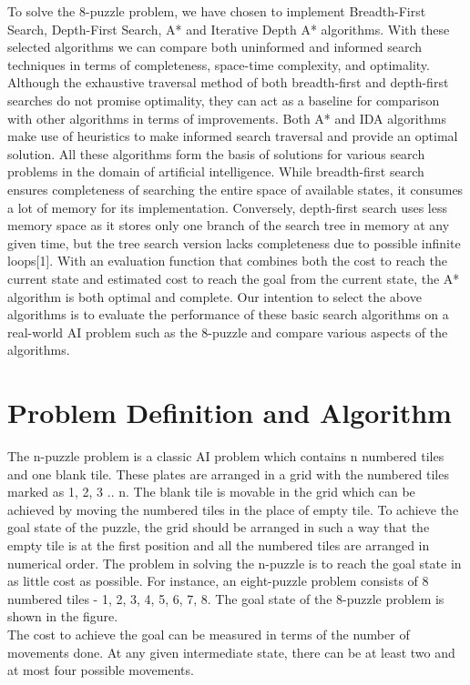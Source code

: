 \documentclass{svproc}
\begin{document}
To solve the 8-puzzle problem, we have chosen to implement Breadth-First Search, Depth-First Search, A* and Iterative Depth A* algorithms. With these selected algorithms we can compare both uninformed and informed search techniques in terms of completeness, space-time complexity, and optimality. Although the exhaustive traversal method of both breadth-first and depth-first searches do not promise optimality, they can act as a baseline for comparison with other algorithms in terms of improvements. Both A* and IDA algorithms make use of heuristics to make informed search traversal and provide an optimal solution. All these algorithms form the basis of solutions for various search problems in the domain of artificial intelligence.
While breadth-first search ensures completeness of searching the entire space of available states, it consumes a lot of memory for its implementation. Conversely, depth-first search uses less memory space as it stores only one branch of the search tree in memory at any given time, but the tree search version lacks completeness due to possible infinite loops[1]. With an evaluation function that combines both the cost to reach the current state and estimated cost to reach the goal from the current state, the A* algorithm is both optimal and complete. Our intention to select the above algorithms is to evaluate the performance of these basic search algorithms on a real-world AI problem such as the 8-puzzle and compare various aspects of the algorithms.


\section{Problem Definition and Algorithm}
The n-puzzle problem is a classic AI problem which contains n numbered tiles and one blank tile. These plates are arranged in a grid with the numbered tiles marked as 1, 2, 3 .. n. The blank tile is movable in the grid which can be achieved by moving the numbered tiles in the place of empty tile. To achieve the goal state of the puzzle, the grid should be arranged in such a way that the empty tile is at the first position and all the numbered tiles are arranged in numerical order. The problem in solving the n-puzzle is to reach the goal state in as little cost as possible. For instance, an eight-puzzle problem consists of 8 numbered tiles - 1, 2, 3, 4, 5, 6, 7, 8. The goal state of the 8-puzzle problem is shown in the figure. \\

The cost to achieve the goal can be measured in terms of the number of movements done. At any given intermediate state, there can be at least two and at most four possible movements.
\end{document}
